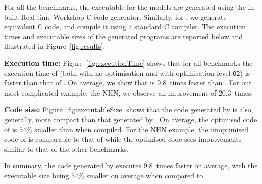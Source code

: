 For all the benchmarks, the executable for the \simulink models are
generated using the in-built Real-time
Workshop\textsuperscript{\textregistered} C code generator.  Similarly,
for \ourTool, we generate equivalent C code, and compile it using a
standard C compiler.
The execution times and executable sizes of the generated programs are reported 
below and illustrated in Figure~\ref{fig:results}.

\textbf{Execution time:} Figure~\ref{fig:executionTime} shows that for
all benchmarks the execution time of \ourTool (both with no optimisation
and with optimisation level \texttt{O2}) is faster than that of
\simulink.  On average, we show that \ourTool is $9.8$~times faster than
\simulink.
For our most complicated example, the \ac{NHN}, we observe an improvement of 
$20.3$~times.

\textbf{Code size:} Figure~\ref{fig:executableSize} shows that the code
generated by \ourTool is also, generally, more compact than that
generated by \simulink.  On average, the optimised code of \ourTool is
$54\%$ smaller than \simulink when compiled.
For the \ac{NHN} example, the unoptimised code of \ourTool is comparable to 
that of \simulink while the optimised code sees improvements similar to that of 
the other benchmarks.

In summary, the code generated by \ourTool executes $9.8$~times faster
on average, with the executable size being $54\%$ smaller on average
when compared to \simulink.




